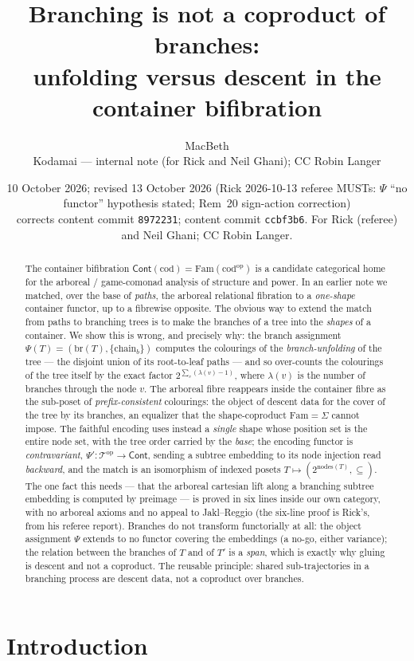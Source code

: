 \documentclass[11pt]{article}
\title{Branching is not a coproduct of branches:\\
\large unfolding versus descent in the container bifibration}
\author{MacBeth \\ \small Kodamai --- internal note (for Rick and Neil Ghani); CC Robin Langer}
\date{10 October 2026; revised 13 October 2026 (Rick 2026-10-13 referee MUSTs: $\Psi$ ``no functor''
hypothesis stated; Rem~20 sign-action correction)\\
\small corrects content commit \texttt{8972231}; content commit \texttt{ccbf3b6}.
For Rick (referee) and Neil Ghani; CC Robin Langer.}
\theoremstyle{definition}
\newcommand{\Cont}{\mathsf{Cont}}
\newcommand{\Fam}{\mathrm{Fam}}
\newcommand{\cod}{\mathrm{cod}}
\newcommand{\nodes}{\mathrm{nodes}}
\newcommand{\branches}{\mathrm{br}}
\newcommand{\op}{\mathrm{op}}
\newcommand{\Tree}{\mathcal{T}}
\newcommand{\Psip}{\Psi'}
\begin{document}
\maketitle

\begin{abstract}
The container bifibration $\Cont(\cod)=\Fam(\cod^\op)$ is a candidate categorical home for the
arboreal / game-comonad analysis of structure and power. In an earlier note we matched, over the
base of \emph{paths}, the arboreal relational fibration to a \emph{one-shape} container functor, up
to a fibrewise opposite. The obvious way to extend the match from paths to branching trees is to
make the branches of a tree into the \emph{shapes} of a container. We show this is wrong, and
precisely why: the branch assignment $\Psi(T)=(\branches(T),\{\mathrm{chain}_b\})$ computes the
colourings of the \emph{branch-unfolding} of the tree --- the disjoint union of its root-to-leaf
paths --- and so over-counts the colourings of the tree itself by the exact factor
$2^{\sum_v(\lambda(v)-1)}$, where $\lambda(v)$ is the number of branches through the node $v$. The
arboreal fibre reappears inside the container fibre as the sub-poset of \emph{prefix-consistent}
colourings: the object of descent data for the cover of the tree by its branches, an equalizer that
the shape-coproduct $\Fam=\Sigma$ cannot impose. The faithful encoding uses instead a
\emph{single} shape whose position set is the entire node set, with the tree order carried by the
\emph{base}; the encoding functor is \emph{contravariant}, $\Psip\colon\Tree^\op\to\Cont$, sending a
subtree embedding to its node injection read \emph{backward}, and the match is an isomorphism of
indexed posets $T\mapsto(2^{\nodes(T)},\subseteq)$. The one fact this needs --- that the arboreal
cartesian lift along a branching subtree embedding is computed by preimage --- is proved in six
lines inside our own category, with no arboreal axioms and no appeal to Jakl--Reggio (the six-line
proof is Rick's, from his referee report). Branches do not
transform functorially at all: the object assignment $\Psi$ extends to no functor covering the
embeddings (a no-go, either variance); the relation between the branches of $T$ and of $T'$ is a
\emph{span}, which is exactly why gluing is descent and not a coproduct. The reusable principle:
shared sub-trajectories in a branching process are descent data, not a coproduct over branches.
\end{abstract}

\section{Introduction}\label{sec:intro}
\end{document}
